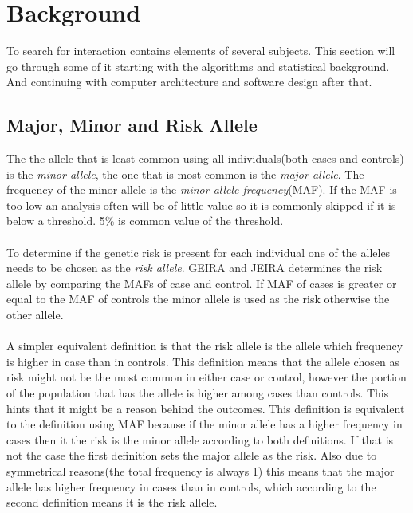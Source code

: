 \documentclass[10pt,a4paper]{report}
\begin{document}

\clearpage
\chapter{Background}
To search for interaction contains elements of several subjects. This section will go through some of it starting with the algorithms and statistical background. And continuing with computer architecture and software design after that.

\section{Major, Minor and Risk Allele}
The the allele that is least common using all individuals(both cases and controls) is the \emph{minor allele}, the one that is most common is the \emph{major allele}. The frequency of the minor allele is the \emph{minor allele frequency}(MAF)\cite{uvehag_master_thesis, geira}. If the MAF is too low an analysis often will be of little value so it is commonly skipped if it is below a threshold. 5\% is common value of the threshold\cite{burton2007genome, geira}.\\
\\
To determine if the genetic risk is present for each individual one of the alleles needs to be chosen as the \emph{risk allele}. GEIRA and JEIRA determines the risk allele by comparing the MAFs of case and control\cite{geisa, uvehag_master_thesis}. If MAF of cases is greater or equal to the MAF of controls the minor allele is used as the risk otherwise the other allele\cite{geisa, uvehag_master_thesis}.\\
\\
A simpler equivalent definition is that the risk allele is the allele which frequency is higher in case than in controls. This definition means that the allele chosen as risk might not be the most common in either case or control, however the portion of the population that has the allele is higher among cases than controls. This hints that it might be a reason behind the outcomes. This definition is equivalent to the definition using MAF because if the minor allele has a higher frequency in cases then it the risk is the minor allele according to both definitions. If that is not the case the first definition sets the major allele as the risk. Also due to symmetrical reasons(the total frequency is always 1) this means that the major allele has higher frequency in cases than in controls, which according to the second definition means it is the risk allele.\\
\end{document}
